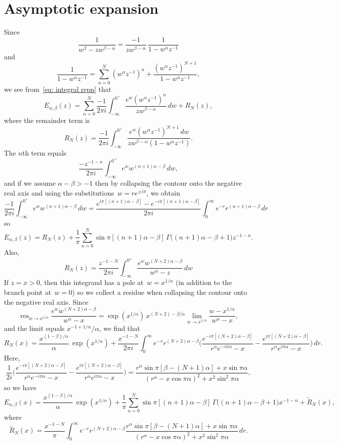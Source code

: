 \documentclass[12pt,a4paper]{article}
\DeclareMathOperator*{\res}{res}
\begin{document}
\section{Asymptotic expansion}
Since
\[
\frac{1}{w^\beta-zw^{\beta-\alpha}}=\frac{-1}{zw^{\beta-\alpha}}
    \,\frac{1}{1-w^\alpha z^{-1}}
\]
and
\[
\frac{1}{1-w^\alpha z^{-1}}=\sum_{n=0}^N(w^\alpha z^{-1})^n
    +\frac{(w^\alpha z^{-1})^{N+1}}{1-w^\alpha z^{-1}},
\]
we see from~\eqref{eq: integral repn} that
\[
E_{\alpha,\beta}(z)=\sum_{n=0}^N\frac{-1}{2\pi i}\int_{-\infty}^{0^+}
    \frac{e^w(w^\alpha z^{-1})^n}{zw^{\beta-\alpha}}\,dw+R_N(z),
\]
where the remainder term is
\[
R_N(z)=\frac{-1}{2\pi i}\int_{-\infty}^{0^+}
    \frac{e^w(w^\alpha z^{-1})^{N+1}\,dw}{zw^{\beta-\alpha}(1-w^\alpha z^{-1})}.
\]
The $n$th term equals
\[
\frac{-z^{-1-n}}{2\pi i}\int_{-\infty}^{0^+}e^w w^{(n+1)\alpha-\beta}\,dw,
\]
and if we assume $\alpha-\beta>-1$ then by collapsing the contour onto the 
negative real axis and using the substitutions~$w=re^{\pm i\pi}$, we obtain
\[
\frac{-1}{2\pi i}\int_{-\infty}^{0^+}e^w w^{(n+1)\alpha-\beta}\,dw
    =\frac{e^{i\pi[(n+1)\alpha-\beta]}-e^{-i\pi[(n+1)\alpha-\beta]}}{2\pi i}
    \int_0^\infty e^{-r}r^{(n+1)\alpha-\beta}\,dr
\]
so
\[
E_{\alpha,\beta}(z)=R_N(z)+\frac{1}{\pi}\sum_{n=0}^N
    \sin\pi[(n+1)\alpha-\beta]\,\Gamma\bigl((n+1)\alpha-\beta+1\bigr)z^{-1-n}.
\]
Also,
\[
R_N(z)=\frac{z^{-1-N}}{2\pi i}\int_{-\infty}^{0^+}
    \frac{e^w w^{(N+2)\alpha-\beta}}{w^\alpha-z}\,dw
\]
If $z=x>0$, then this integrand has a pole at~$w=x^{1/\alpha}$ (in addition to
the branch point at~$w=0$) so we collect a residue when collapsing the contour 
onto the negative real axis.  Since
\[
\res_{w\to x^{1/\alpha}}\frac{e^w w^{(N+2)\alpha-\beta}}{w^\alpha-x}
    =\exp(x^{1/\alpha})\,x^{(N+2)-\beta/\alpha}\lim_{w\to x^{1/\alpha}}
    \frac{w-x^{1/\alpha}}{w^\alpha-x},
\]
and the limit equals $x^{-1+1/\alpha}/\alpha$, we find that
\[
R_N(x)=\frac{x^{(1-\beta)/\alpha}}{\alpha}\,\exp(x^{1/\alpha})
    +\frac{x^{-1-N}}{2\pi i}\int_0^\infty e^{-r}r^{(N+2)\alpha-\beta}\biggr(
     \frac{e^{-i\pi[(N+2)\alpha-\beta]}}{r^\alpha e^{-i\pi\alpha}-x}
    -\frac{e^{i\pi[(N+2)\alpha-\beta]}}{r^\alpha e^{i\pi\alpha}-x}\biggr)\,dr.
\]
Here,
\[
\frac{1}{2i}\biggr(
     \frac{e^{-i\pi[(N+2)\alpha-\beta]}}{r^\alpha e^{-i\pi\alpha}-x}
    -\frac{e^{i\pi[(N+2)\alpha-\beta]}}{r^\alpha e^{i\pi\alpha}-x}\biggr)
    =\frac{r^\alpha\sin\pi[\beta-(N+1)\alpha]+x\sin\pi\alpha}%
{(r^\alpha-x\cos\pi\alpha)^2+x^2\sin^2\pi\alpha},
\] 
so we have
\[
E_{\alpha,\beta}(x)=\frac{x^{(1-\beta)/\alpha}}{\alpha}\,\exp(x^{1/\alpha})
    +\frac{1}{\pi}\sum_{n=0}^N
    \sin\pi[(n+1)\alpha-\beta]\,\Gamma\bigl((n+1)\alpha-\beta+1\bigr)x^{-1-n}
    +\tilde R_N(x),
\]
where
\[
\tilde R_N(x)=\frac{x^{-1-N}}{\pi}\int_0^\infty e^{-r}r^{(N+2)\alpha-\beta}
    \frac{r^\alpha\sin\pi[\beta-(N+1)\alpha]+x\sin\pi\alpha}%
{(r^\alpha-x\cos\pi\alpha)^2+x^2\sin^2\pi\alpha}\,dr.
\]
\end{document}
